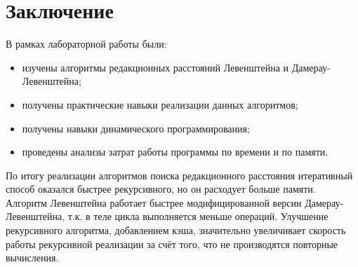 \chapter*{Заключение}

В рамках лабораторной работы были:

\begin{itemize}
	\item изучены алгоритмы редакционных расстояний Левенштейна и Дамерау-Левенштейна;
	\item получены практические навыки реализации данных алгоритмов;
	\item получены навыки динамического программирования;
	\item проведены анализы затрат работы программы по времени и по памяти. 
\end{itemize}

По итогу реализации алгоритмов поиска редакционного расстояния итеративный способ оказался быстрее рекурсивного, но он расходует больше памяти.
Алгоритм Левенштейна работает быстрее модифицированной версии Дамерау-Левенштейна, т.к. в теле цикла выполняется меньше операций.
Улучшение рекурсивного алгоритма, добавлением кэша, значительно увеличивает скорость работы рекурсивной реализации за счёт того, что не производятся повторные вычисления.

